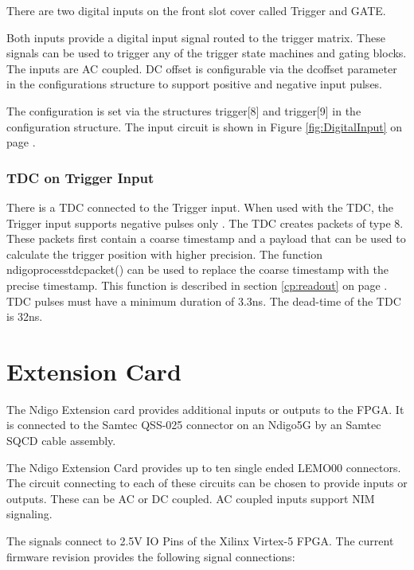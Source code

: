 		There are two digital inputs on the front slot cover called Trigger and GATE.\par
		Both inputs provide a digital input signal routed to the trigger matrix. These signals can be used to trigger any of the trigger state machines and gating blocks. The inputs are AC coupled. DC offset is configurable via the \textsf{dc\textunderscore offset} parameter in the configurations structure to support positive and negative input pulses.\par
		The configuration is set via the structures trigger[8] and trigger[9] in the configuration structure. The input circuit is shown in Figure \ref{fig:DigitalInput} on page \pageref{fig:DigitalInput}.
		
		\subsubsection{TDC on Trigger Input}
		
			There is a TDC connected to the Trigger input. When used with the TDC, the Trigger input supports negative pulses only . The TDC creates packets of type 8. These packets first contain a coarse timestamp and a payload that can be used to calculate the trigger position with higher precision. The function \textsf{ndigo\textunderscore process\textunderscore tdc\textunderscore packet()} can be used to replace the coarse timestamp with the precise timestamp. This function is described in section \ref{cp:readout} on page \pageref{cp:readout}.
TDC pulses must have a minimum duration of 3.3ns. The dead-time of the TDC is 32ns.

\section{Extension Card\label{cp:extcard}}

	The Ndigo Extension card provides additional inputs or outputs to the FPGA. It is connected to the Samtec QSS-025 connector on an Ndigo5G by an Samtec SQCD cable assembly.\par
	The Ndigo Extension Card provides up to ten single ended LEMO00 connectors. The circuit connecting to each of these circuits can be chosen to provide inputs or outputs. These can be AC or DC coupled. AC coupled inputs support NIM signaling.\par 
	The signals connect to 2.5V IO Pins of the Xilinx Virtex-5 FPGA. The current firmware revision provides the following signal connections:\par
	
